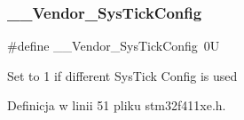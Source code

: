\subsubsection{\texorpdfstring{\+\_\+\+\_\+\+Vendor\+\_\+\+Sys\+Tick\+Config}{\_\_Vendor\_SysTickConfig}}
{\footnotesize\ttfamily \#define \+\_\+\+\_\+\+Vendor\+\_\+\+Sys\+Tick\+Config~0U}

Set to 1 if different Sys\+Tick Config is used 

Definicja w linii 51 pliku stm32f411xe.\+h.


